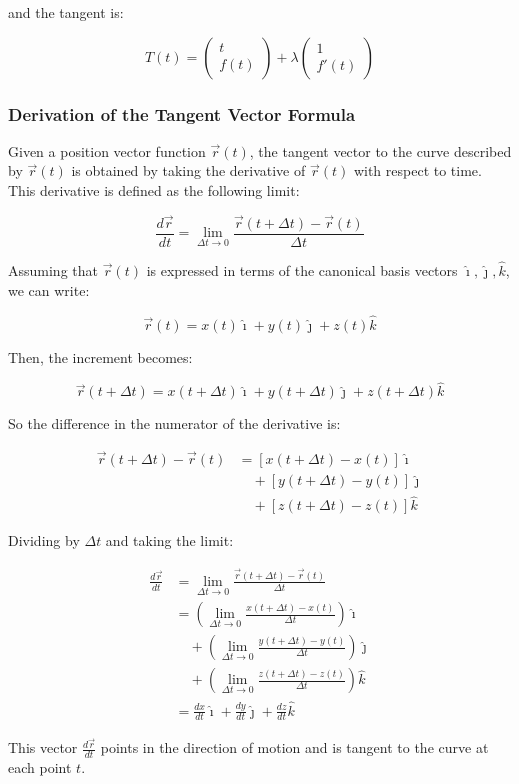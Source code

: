 and the tangent is:

\[
T(t) = \begin{pmatrix}
    t \\ f(t)
\end{pmatrix} + \lambda \begin{pmatrix}
    1 \\ f'(t)
\end{pmatrix}
\]

\subsubsection{Derivation of the Tangent Vector Formula}

Given a position vector function \(\vec{r}(t)\), the tangent vector to the curve described by \(\vec{r}(t)\) is obtained by taking the derivative of \(\vec{r}(t)\) with respect to time. This derivative is defined as the following limit:

\[
\frac{d\vec{r}}{dt} = \lim_{\Delta t \to 0} \frac{\vec{r}(t + \Delta t) - \vec{r}(t)}{\Delta t}
\]

Assuming that \(\vec{r}(t)\) is expressed in terms of the canonical basis vectors \(\hat{\imath}, \hat{\jmath}, \hat{k}\), we can write:

\[
\vec{r}(t) = x(t)\hat{\imath} + y(t)\hat{\jmath} + z(t)\hat{k}
\]

Then, the increment becomes:

\[
\vec{r}(t + \Delta t) = x(t + \Delta t)\hat{\imath} + y(t + \Delta t)\hat{\jmath} + z(t + \Delta t)\hat{k}
\]

So the difference in the numerator of the derivative is:

\begin{align*}
\vec{r}(t + \Delta t) - \vec{r}(t) &= \left[x(t + \Delta t) - x(t)\right]\hat{\imath} \\
&\quad + \left[y(t + \Delta t) - y(t)\right]\hat{\jmath} \\
&\quad + \left[z(t + \Delta t) - z(t)\right]\hat{k}
\end{align*}

Dividing by \(\Delta t\) and taking the limit:

\begin{align*}
\frac{d\vec{r}}{dt} &= \lim_{\Delta t \to 0} \frac{\vec{r}(t + \Delta t) - \vec{r}(t)}{\Delta t} \\
&= \left( \lim_{\Delta t \to 0} \frac{x(t + \Delta t) - x(t)}{\Delta t} \right) \hat{\imath} \\
&\quad + \left( \lim_{\Delta t \to 0} \frac{y(t + \Delta t) - y(t)}{\Delta t} \right) \hat{\jmath} \\
&\quad + \left( \lim_{\Delta t \to 0} \frac{z(t + \Delta t) - z(t)}{\Delta t} \right) \hat{k} \\
&= \frac{dx}{dt} \hat{\imath} + \frac{dy}{dt} \hat{\jmath} + \frac{dz}{dt} \hat{k}
\end{align*}

This vector \(\frac{d\vec{r}}{dt}\) points in the direction of motion and is tangent to the curve at each point \(t\).


\newpage